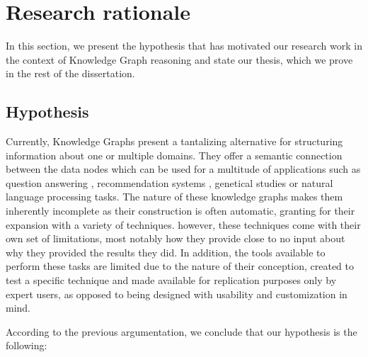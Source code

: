 \section{Research rationale}\label{sec:intro-rationale}
In this section, we present the hypothesis that has motivated our research work in the context of Knowledge Graph reasoning and state our thesis, which we prove in the rest of the dissertation.

\subsection{Hypothesis}

Currently, Knowledge Graphs present a tantalizing alternative for structuring information about one or multiple domains. They offer a semantic connection between the data nodes which can be used for a multitude of applications such as question answering \cite{}, recommendation systems \cite{}, genetical studies \cite{} or natural language processing tasks. The nature of these knowledge graphs makes them inherently incomplete as their construction is often automatic, granting for their expansion with a variety of techniques. 
however, these techniques \cite{} come with their own set of limitations, most notably how they provide close to no input about why they provided the results they did. In addition, the tools available to perform these tasks are limited due to the nature of their conception, created to test a specific technique and made available for replication purposes only by expert users, as opposed to being designed with usability and customization in mind.

According to the previous argumentation, we conclude that our hypothesis is the following:



